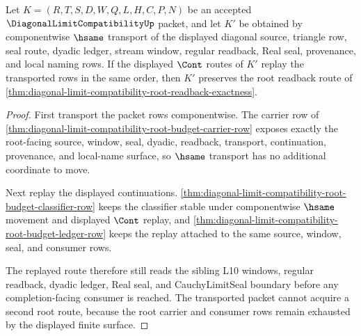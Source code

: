 \begin{theorem}
\label{thm:diagonal-limit-compatibility-root-transport-replay}
Let $K=(R,T,S,D,W,Q,L,H,C,P,N)$ be an accepted $\DiagonalLimitCompatibilityUp$ packet, and let $K'$ be obtained by componentwise $\hsame$ transport of the displayed diagonal source, triangle row, seal route, dyadic ledger, stream window, regular readback, Real seal, provenance, and local naming rows. If the displayed $\Cont$ routes of $K'$ replay the transported rows in the same order, then $K'$ preserves the root readback route of \autoref{thm:diagonal-limit-compatibility-root-readback-exactness}.
\end{theorem}
\begin{proof}
First transport the packet rows componentwise. The carrier row of \autoref{thm:diagonal-limit-compatibility-root-budget-carrier-row} exposes exactly the root-facing source, window, seal, dyadic, readback, transport, continuation, provenance, and local-name surface, so $\hsame$ transport has no additional coordinate to move.

Next replay the displayed continuations. \autoref{thm:diagonal-limit-compatibility-root-budget-classifier-row} keeps the classifier stable under componentwise $\hsame$ movement and displayed $\Cont$ replay, and \autoref{thm:diagonal-limit-compatibility-root-budget-ledger-row} keeps the replay attached to the same source, window, seal, and consumer rows.

The replayed route therefore still reads the sibling L10 windows, regular readback, dyadic ledger, Real seal, and CauchyLimitSeal boundary before any completion-facing consumer is reached. The transported packet cannot acquire a second root route, because the root carrier and consumer rows remain exhausted by the displayed finite surface.
\end{proof}

